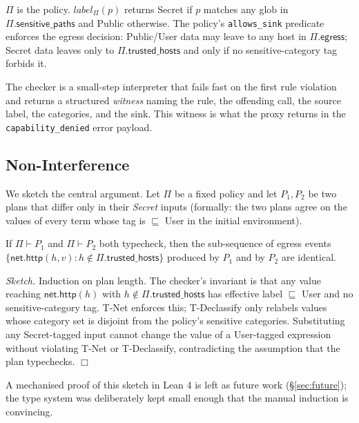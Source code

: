 \documentclass[11pt,a4paper]{article}
\begin{document}
$\Pi$ is the policy. $\mathit{label}_\Pi(p)$ returns Secret if $p$
matches any glob in $\Pi.\mathsf{sensitive\_paths}$ and Public
otherwise. The policy's \texttt{allows\_sink} predicate enforces the
egress decision: Public/User data may leave to any host in
$\Pi.\mathsf{egress}$; Secret data leaves only to
$\Pi.\mathsf{trusted\_hosts}$ and only if no sensitive-category tag
forbids it.

The checker is a small-step interpreter that fails fast on the
first rule violation and returns a structured \emph{witness} naming
the rule, the offending call, the source label, the categories, and
the sink. This witness is what the proxy returns in the
\texttt{capability\_denied} error payload.

\subsection{Non-Interference}\label{sec:noninterference}

We sketch the central argument. Let $\Pi$ be a fixed policy and let
$P_1, P_2$ be two plans that differ only in their \emph{Secret} inputs
(formally: the two plans agree on the values of every term whose tag
is $\sqsubseteq$ User in the initial environment).

\begin{theorem}
If $\Pi \vdash P_1$ and $\Pi \vdash P_2$ both typecheck, then the
sub-sequence of egress events $\{\mathsf{net.http}(h, v) :
h \notin \Pi.\mathsf{trusted\_hosts}\}$ produced by $P_1$ and by
$P_2$ are identical.
\end{theorem}

\noindent\emph{Sketch.} Induction on plan length. The checker's
invariant is that any value reaching $\mathsf{net.http}(h)$ with
$h \notin \Pi.\mathsf{trusted\_hosts}$ has effective label
$\sqsubseteq$ User and no sensitive-category tag. T-Net enforces
this; T-Declassify only relabels values whose category set is
disjoint from the policy's sensitive categories. Substituting any
Secret-tagged input cannot change the value of a User-tagged
expression without violating T-Net or T-Declassify, contradicting
the assumption that the plan typechecks. $\Box$

A mechanised proof of this sketch in Lean 4 is left as future work
(\S\ref{sec:future}); the type system was deliberately kept small
enough that the manual induction is convincing.

\end{document}
